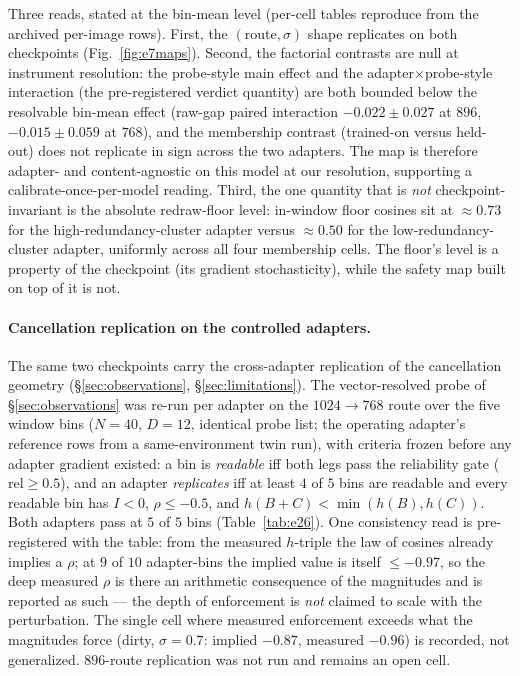Three reads, stated at the bin-mean level (per-cell tables reproduce
from the archived per-image rows). First, the $(\text{route}, \sigma)$
shape replicates on both checkpoints (Fig.~\ref{fig:e7maps}). Second,
the factorial contrasts are null at instrument resolution: the
probe-style main effect and the adapter$\times$probe-style interaction
(the pre-registered verdict quantity) are both bounded below the
resolvable bin-mean effect (raw-gap paired interaction
$-0.022 \pm 0.027$ at $896$, $-0.015 \pm 0.059$ at $768$), and the
membership contrast (trained-on versus held-out) does not replicate in
sign across the two adapters. The map is therefore adapter- and
content-agnostic on this model at our resolution, supporting a
calibrate-once-per-model reading. Third, the one quantity that is
\emph{not} checkpoint-invariant is the absolute redraw-floor level:
in-window floor cosines sit at ${\approx}0.73$ for the
high-redundancy-cluster adapter versus ${\approx}0.50$ for the
low-redundancy-cluster adapter, uniformly across all four membership
cells. The floor's level is a property of the checkpoint (its gradient
stochasticity), while the safety map built on top of it is not.

\paragraph{Cancellation replication on the controlled adapters.}
The same two checkpoints carry the cross-adapter replication of the
cancellation geometry (\S\ref{sec:observations},
\S\ref{sec:limitations}). The vector-resolved probe of
\S\ref{sec:observations} was re-run per adapter on the $1024{\to}768$
route over the five window bins ($N{=}40$, $D{=}12$, identical probe
list; the operating adapter's reference rows from a same-environment
twin run), with criteria frozen before any adapter gradient existed:
a bin is \emph{readable} iff both legs pass the reliability gate
($\mathrm{rel} \ge 0.5$), and an adapter \emph{replicates} iff at
least $4$ of $5$ bins are readable and every readable bin has
$I < 0$, $\rho \le -0.5$, and $h(B{+}C) < \min(h(B), h(C))$. Both
adapters pass at $5$ of $5$ bins (Table~\ref{tab:e26}). One
consistency read is pre-registered with the table: from the measured
$h$-triple the law of cosines already implies a $\rho$; at $9$ of
$10$ adapter-bins the implied value is itself $\le -0.97$, so the
deep measured $\rho$ is there an arithmetic consequence of the
magnitudes and is reported as such --- the depth of enforcement is
\emph{not} claimed to scale with the perturbation. The single cell
where measured enforcement exceeds what the magnitudes force
(dirty, $\sigma = 0.7$: implied $-0.87$, measured $-0.96$) is
recorded, not generalized. $896$-route replication was not run and
remains an open cell.

